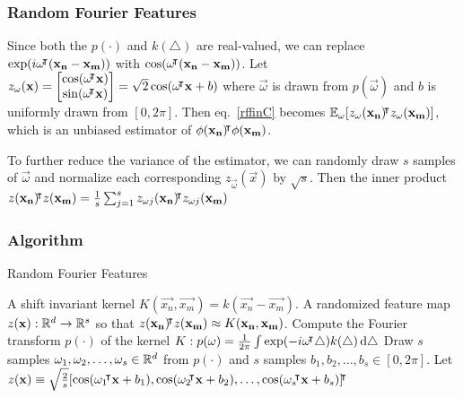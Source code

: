 \documentclass[10pt]{../formats/RU}
\begin{document}
\begin{frame}
  \frametitle{Random Fourier Features}
  Since both the $p(\cdot)$ and $k(\triangle)$ are real-valued, we can replace $\exp(i\mathbf{\omega}{}^{\mkern-4mu\intercal}(\mathbf{x_n-x_m}))$ with $\cos(\mathbf{\omega}{}^{\mkern-4mu\intercal}(\mathbf{x_n-x_m}))$. Let
  $
  z_{\mathbf{\omega}}(\mathbf{x})=
  \begin{bmatrix}
    \cos(\mathbf{\mathbf{\omega}{}^{\mkern-4mu\intercal} x}) \\
    \sin(\mathbf{\mathbf{\omega}{}^{\mkern-4mu\intercal} x})
  \end{bmatrix}
  =\sqrt{2}\cos(\mathbf{\omega}{}^{\mkern-4mu\intercal}\mathbf{x}+b)$ where $\vec{\omega}$ is drawn from $p(\vec{\omega})$ and $b$ is uniformly drawn from $[0, 2\pi]$. Then eq.~\eqref{rffinC} becomes $\mathbb{E}_{\mathbf{\omega}}[z_{\mathbf{\omega}}(\mathbf{x_n}){}^{\mkern-4mu\intercal} z_{\mathbf{\omega}}(\mathbf{x_m})]$, which is an unbiased estimator of $\phi(\mathbf{x_n}){}^{\mkern-4mu\intercal}\phi(\mathbf{x_m})$.

  To further reduce the variance of the estimator, we can randomly draw $s$ samples of $\vec{\omega}$ and normalize each corresponding $z_{\vec{\omega}}(\vec{x})$ by $\sqrt{s}$. Then the inner product $z(\mathbf{x_n}){}^{\mkern-4mu\intercal} z(\mathbf{x_m})=\frac{1}{s}\sum_{j=1}^{s}z_{\mathbf{\omega}j}(\mathbf{x_n}){}^{\mkern-4mu\intercal} z_{\mathbf{\omega}j}(\mathbf{x_m})$
\end{frame}
\begin{frame}
  \frametitle{Algorithm}
  \begin{algorithm}[H]
    \caption{Random Fourier Features}\label{RFF}
    \begin{algorithmic}
    \Require A shift invariant kernel $K(\vec{x_n}, \vec{x_m}) = k(\vec{x_n}- \vec{x_m})$.
    \Ensure A randomized feature map $z(\mathbf{x}): \mathbb{R}^d\rightarrow\mathbb{R}^s$ so that $z(\mathbf{x_n}){}^{\mkern-4mu\intercal} z(\mathbf{x_m})\approx K(\mathbf{x_n}, \mathbf{x_m})$.
    \State Compute the Fourier transform $p(\cdot)$ of the kernel $K: p(\mathbf{\omega})=\frac{1}{2\pi}\int \exp(-i\mathbf{\omega}{}^{\mkern-4mu\intercal}\triangle)k(\triangle)\mathop{}\!\mathrm{d}\triangle$
    \State Draw $s$ \iid samples $\mathbf{\omega}_1, \mathbf{\omega}_2, \ldots, \mathbf{\omega}_s \in \mathbb{R}^d$ from $p(\cdot)$ and $s$ \iid samples $b_1, b_2, \ldots, b_s \in [0, 2\pi]$.
    \State Let $z(\mathbf{x})\equiv \sqrt{\frac{2}{s}}[\cos(\mathbf{\omega}_1{}^{\mkern-4mu\intercal}\mathbf{x}+b_1), \cos(\mathbf{\omega}_2{}^{\mkern-4mu\intercal}\mathbf{x}+b_2), \ldots, \cos(\mathbf{\omega}_s{}^{\mkern-4mu\intercal}\mathbf{x}+b_s)]{}^{\mkern-4mu\intercal}$
    \end{algorithmic}
  \end{algorithm}
\end{frame}
\end{document}
